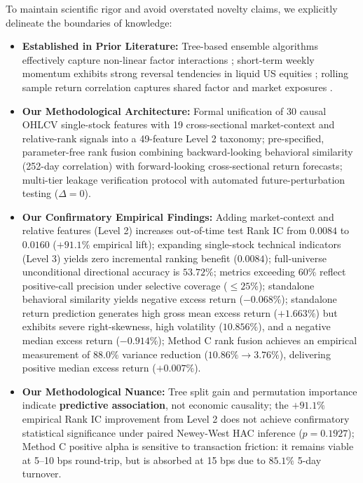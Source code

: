 \documentclass[11pt,a4paper]{article}
\begin{document}
To maintain scientific rigor and avoid overstated novelty claims, we explicitly delineate the boundaries of knowledge:
\begin{itemize}
    \item \textbf{Established in Prior Literature:} Tree-based ensemble algorithms effectively capture non-linear factor interactions \cite{gu2020empirical}; short-term weekly momentum exhibits strong reversal tendencies in liquid US equities \cite{jegadeesh1993returns, lehmann1990fads}; rolling sample return correlation captures shared factor and market exposures \cite{ledoit2004honey}.
    \item \textbf{Our Methodological Architecture:} Formal unification of 30 causal OHLCV single-stock features with 19 cross-sectional market-context and relative-rank signals into a 49-feature Level 2 taxonomy; pre-specified, parameter-free rank fusion combining backward-looking behavioral similarity (252-day correlation) with forward-looking cross-sectional return forecasts; multi-tier leakage verification protocol with automated future-perturbation testing ($\Delta = 0$).
    \item \textbf{Our Confirmatory Empirical Findings:} Adding market-context and relative features (Level 2) increases out-of-time test Rank IC from $0.0084$ to $0.0160$ ($+91.1\%$ empirical lift); expanding single-stock technical indicators (Level 3) yields zero incremental ranking benefit ($0.0084$); full-universe unconditional directional accuracy is $53.72\%$; metrics exceeding $60\%$ reflect positive-call precision under selective coverage ($\le 25\%$); standalone behavioral similarity yields negative excess return ($-0.068\%$); standalone return prediction generates high gross mean excess return ($+1.663\%$) but exhibits severe right-skewness, high volatility ($10.856\%$), and a negative median excess return ($-0.914\%$); Method C rank fusion achieves an empirical measurement of $88.0\%$ variance reduction ($10.86\% \to 3.76\%$), delivering positive median excess return ($+0.007\%$).
    \item \textbf{Our Methodological Nuance:} Tree split gain and permutation importance indicate \textbf{predictive association}, not economic causality; the $+91.1\%$ empirical Rank IC improvement from Level 2 does not achieve confirmatory statistical significance under paired Newey-West HAC inference ($p = 0.1927$); Method C positive alpha is sensitive to transaction friction: it remains viable at 5--10 bps round-trip, but is absorbed at 15 bps due to $85.1\%$ 5-day turnover.
\end{itemize}
\end{document}
